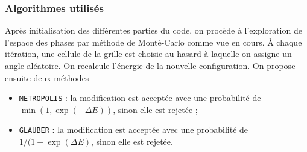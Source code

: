 \documentclass[a4paper, 11pt]{article}
\begin{document}
\subsubsection{Algorithmes utilisés}

Après initialisation des différentes parties du code, on procède à l'exploration de l'espace des
phases par méthode de Monté-Carlo comme vue en cours. À chaque itération, une cellule de la grille
est choisie au hasard à laquelle on assigne un angle aléatoire. On recalcule l'énergie de la
nouvelle configuration. On propose ensuite deux méthodes
\begin{itemize}
    \item  \texttt{METROPOLIS} : la modification est acceptée avec une probabilité de $\min(1, \exp(-\Delta
        E))$, sinon elle est rejetée ;
    \item \texttt{GLAUBER} : la modification est acceptée avec une probabilité de $1/(1+\exp(\Delta
        E)$, sinon elle est rejetée.
\end{itemize}
\end{document}
